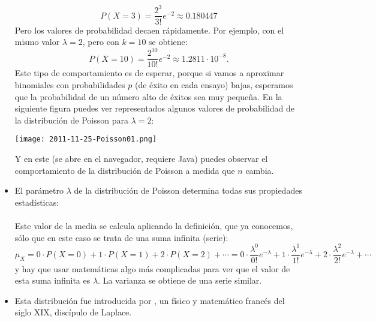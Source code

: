 \begin{itemize}
         \[P(X=3)=\dfrac{2^3}{3!}e^{-2}\approx  0.180447\]
         Pero los valores de probabilidad decaen rápidamente. Por ejemplo, con el mismo valor $\lambda=2$, pero con $k=10$ se obtiene:
         \[P(X=10)=\dfrac{2^{10}}{10!}e^{-2}\approx 1.2811\cdot 10^{-8}.\]
         Este tipo de comportamiento es de esperar, porque si vamos a aproximar binomiales con probabilidades $p$ (de éxito en cada ensayo) bajas, esperamos que la probabilidad de un número alto de éxitos sea muy pequeña.
         En la siguiente figura puedes ver representados algunos valores de probabilidad de la distribución de Poisson para $\lambda=2$:
         \begin{center}
         \texttt{[image: 2011-11-25-Poisson01.png]}
         \end{center}
         Y en este  (se abre en el navegador, requiere Java) puedes observar el comportamiento de la distribución de Poisson a medida que $n$ cambia.

    \item El parámetro $\lambda$ de la distribución de Poisson determina todas sus propiedades estadísticas:\\[3mm]
         \\[3mm]
         Este valor de la media se calcula aplicando la definición, que ya conocemos,  sólo que en este caso se trata de una suma infinita (serie):
         \[\mu_X=0\cdot P(X=0)+1\cdot P(X=1)+2\cdot P(X=2)+\cdots=
         0\cdot\dfrac{\lambda^0}{0!}e^{-\lambda}+1\cdot\dfrac{\lambda^1}{1!}e^{-\lambda}+2\cdot\dfrac{\lambda^2}{2!}e^{-\lambda}+\cdots\]
         y hay que usar matemáticas algo más complicadas para ver que el valor de esta suma infinita es $\lambda$. La varianza se obtiene de una serie similar.

    \item Esta distribución fue introducida por  , un físico y matemático francés del siglo XIX, discípulo de Laplace.


\end{itemize}
